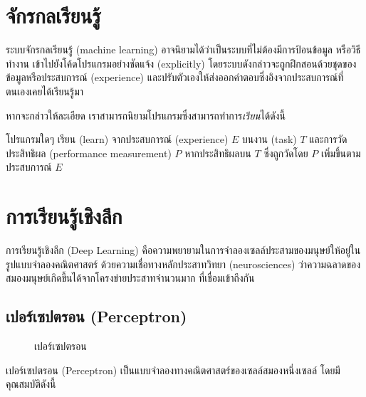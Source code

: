 \section{จักรกลเรียนรู้}
ระบบจักรกลเรียนรู้ (machine learning) อาจนิยามได้ว่าเป็นระบบที่ไม่ต้องมีการป้อนข้อมูล หรือวิธีทำงาน เข้าไปยังโค้ดโปรแกรมอย่างชัดแจ้ง (explicitly) โดยระบบดังกล่าวจะถูกฝึกสอนด้วยชุดของข้อมูลหรือประสบการณ์ (experience) และปรับตัวเองให้ส่งออกคำตอบซึ่งอิงจากประสบการณ์ที่ตนเองเคยได้เรียนรู้มา

หากจะกล่าวให้ละเอียด เราสามารถนิยามโปรแกรมซึ่งสามารถทำการ\textit{เรียน}ได้ดังนี้ \cite{Mitchell97}

\begin{definition}
โปรแกรมใดๆ เรียน (learn) จากประสบการณ์ (experience) $E$ บนงาน (task) $T$ และการวัดประสิทธิผล (performance measurement) $P$ หากประสิทธิผลบน $T$ ซึ่งถูกวัดโดย $P$ เพิ่มขึ้นตามประสบการณ์ $E$
\end{definition}

\section{การเรียนรู้เชิงลึก}
การเรียนรู้เชิงลึก (Deep Learning) คือความพยายามในการจำลองเซลล์ประสามของมนุษย์ให้อยู่ในรูปแบบจำลองคณิตศาสตร์
ด้วยความเชื่อทางหลักประสาทวิทยา (neurosciences) ว่าความฉลาดของสมองมนุษย์เกิดขึ้นได้จากโครงข่ายประสาทจำนวนมาก
ที่เชื่อมเข้าถึงกัน \cite{Goodfellow-et-al-2016}

\subsection{เปอร์เซปตรอน (Perceptron)}
\begin{figure}
    \centering
    \caption{เปอร์เซปตรอน}
    \label{tikz-perceptron}
\end{figure}
เปอร์เซปตรอน (Perceptron) \cite{rosenblatt_1958} เป็นแบบจำลองทางคณิตศาสตร์ของเซลล์สมองหนึ่งเซลล์ โดยมีคุณสมบัติดังนี้

